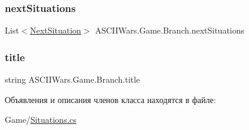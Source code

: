 \subsubsection{\texorpdfstring{next\+Situations}{nextSituations}}
{\footnotesize\ttfamily List$<$\hyperlink{class_a_s_c_i_i_wars_1_1_game_1_1_next_situation}{Next\+Situation}$>$ A\+S\+C\+I\+I\+Wars.\+Game.\+Branch.\+next\+Situations}

\hypertarget{class_a_s_c_i_i_wars_1_1_game_1_1_branch_aa1a7fc6d8ff84881ecea850ef481616d}{}\label{class_a_s_c_i_i_wars_1_1_game_1_1_branch_aa1a7fc6d8ff84881ecea850ef481616d} 
\subsubsection{\texorpdfstring{title}{title}}
{\footnotesize\ttfamily string A\+S\+C\+I\+I\+Wars.\+Game.\+Branch.\+title}



Объявления и описания членов класса находятся в файле\+:\begin{DoxyCompactItemize}
\item 
Game/\hyperlink{_situations_8cs}{Situations.\+cs}\end{DoxyCompactItemize}
